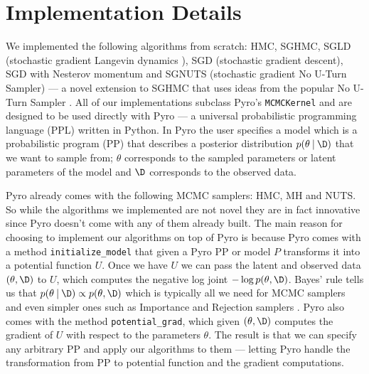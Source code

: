 

\section{Implementation Details}

We implemented the following algorithms from scratch: HMC, SGHMC, SGLD (stochastic gradient Langevin dynamics \cite{sgld}), SGD (stochastic gradient descent), SGD with Nesterov momentum and SGNUTS (stochastic gradient No U-Turn Sampler) — a novel extension to SGHMC that uses ideas from the popular No U-Turn Sampler \cite{nuts}. All of our implementations subclass Pyro's \texttt{MCMCKernel} and are designed to be used directly with Pyro \cite{pyro} — a universal probabilistic programming language (PPL) written in Python. In Pyro the user specifies a model which is a probabilistic program (PP) that describes a posterior distribution $p(\theta \: | \: \D)$ that we want to sample from; $\theta$ corresponds to the sampled parameters or latent parameters of the model and $\D$ corresponds to the observed data. 

Pyro already comes with the following MCMC samplers: HMC, MH and NUTS. So while the algorithms we implemented are not novel they are in fact innovative since Pyro doesn't come with any of them already built. The main reason for choosing to implement our algorithms on top of Pyro is because Pyro comes with a method \texttt{initialize\_model} that given a Pyro PP or model $P$ transforms it into a potential function $U$. Once we have $U$ we can pass the latent and observed data $(\theta, \D)$ to $U$, which computes the negative log joint $- \log p(\theta, \D)$. Bayes' rule tells us that  $p(\theta \: | \: \D) \propto p(\theta, \D)$ which is typically all we need for MCMC samplers and even simpler ones such as Importance and Rejection samplers \cite{bishop2006pattern}. Pyro also comes with the method \texttt{potential\_grad}, which given $(\theta, \D)$ computes the gradient of $U$ with respect to the parameters $\theta$. The result is that we can specify any arbitrary PP and apply our algorithms to them — letting Pyro handle the transformation from PP to potential function and the gradient computations.

